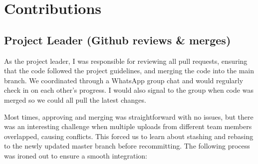 \section{Contributions}\label{contributions}

\subsection{Project Leader (Github reviews \&
merges)}\label{project-leader-github-reviews-merges}

As the project leader, I was responsible for reviewing all pull
requests, ensuring that the code followed the project guidelines, and
merging the code into the main branch. We coordinated through a WhatsApp
group chat and would regularly check in on each other's progress. I
would also signal to the group when code was merged so we could all pull
the latest changes.

Most times, approving and merging was straightforward with no issues,
but there was an interesting challenge when multiple uploads from
different team members overlapped, causing conflicts. This forced us to
learn about stashing and rebasing to the newly updated master branch
before recommitting. The following process was ironed out to ensure a
smooth integration:

